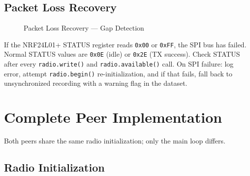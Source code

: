 \documentclass[11pt,a4paper]{article}
\begin{document}
\subsection{Packet Loss Recovery}

\begin{figure}[htbp]
\begin{algorithm}[H]
\SetAlgoLined
{}
\caption{Packet Loss Recovery --- Gap Detection}
\label{alg:gap-detection}
\end{algorithm}
\end{figure}

\begin{dangerbox}
If the NRF24L01+ STATUS register reads \texttt{0x00} or \texttt{0xFF}, the SPI bus has failed. Normal STATUS values are \texttt{0x0E} (idle) or \texttt{0x2E} (TX success). Check STATUS after every \texttt{radio.write()} and \texttt{radio.available()} call. On SPI failure: log error, attempt \texttt{radio.begin()} re-initialization, and if that fails, fall back to unsynchronized recording with a warning flag in the dataset.
\end{dangerbox}


\section{Complete Peer Implementation}

Both peers share the same radio initialization; only the main loop differs.

\subsection{Radio Initialization}
\end{document}
